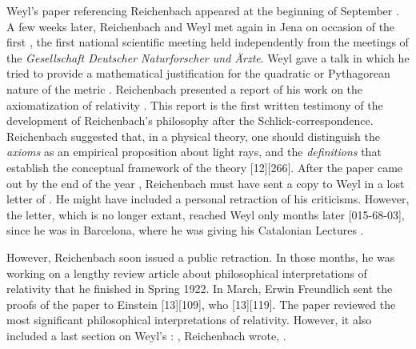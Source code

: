 \documentclass[draft]{article}
\begin{document}
Weyl's paper referencing Reichenbach appeared at the beginning of September \citep{Weyl1921e}. A few weeks later, Reichenbach and Weyl met again in Jena on occasion of the first  , the first national scientific meeting held independently from the meetings of the \textit{Gesellschaft Deutscher Naturforscher und Ärzte}. Weyl gave a talk in which he tried to provide a mathematical justification for the quadratic or Pythagorean nature of the metric \citep{Weyl1921f}. Reichenbach presented a report of his work on the axiomatization of relativity \citep{Reichenbach1921d}. This report is the first written testimony of the development of Reichenbach's philosophy after the Schlick-correspondence. Reichenbach suggested that, in a physical theory, one should distinguish the \emph{axioms} as an empirical proposition about light rays, \rac\etc and the \emph{definitions} that establish the conceptual framework of the theory [12][266]. After the paper came out by the end of the year \citep{Reichenbach1921d}, Reichenbach must have sent a copy to Weyl in a lost letter of . He might have included a personal retraction of his criticisms. However, the letter, which is no longer extant, reached Weyl only months later [015-68-03], since he was in Barcelona, where he was giving his Catalonian Lectures \citep{Weyl1923}.

However, Reichenbach soon issued a public retraction. In those months, he was working on a lengthy review article about philosophical interpretations of relativity that he finished in Spring 1922. In March, Erwin Freundlich sent the proofs of the paper  to Einstein [13][109], who  [13][119]. The paper reviewed the most significant philosophical interpretations of relativity. However, it also included a last section on Weyl's \uft: , Reichenbach wrote,  \citep[365]{Reichenbach1922a}.
\end{document}
